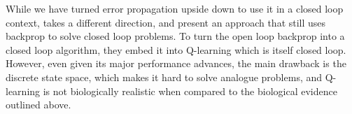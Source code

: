 \documentclass[Afour,sageh,times]{sagej}
\begin{document}
While we have turned error propagation upside down to use it in a
closed loop context, \cite{Guo2014} takes a different direction, and
present an approach that still uses backprop to solve closed loop
problems. To turn the open loop backprop into a closed loop algorithm,
they embed it into Q-learning which is itself closed loop. However,
even given its major performance advances, the main drawback is the
discrete state space, which makes it hard to solve analogue problems,
and Q-learning is not biologically realistic when compared to the
biological evidence outlined above.




\end{document}
